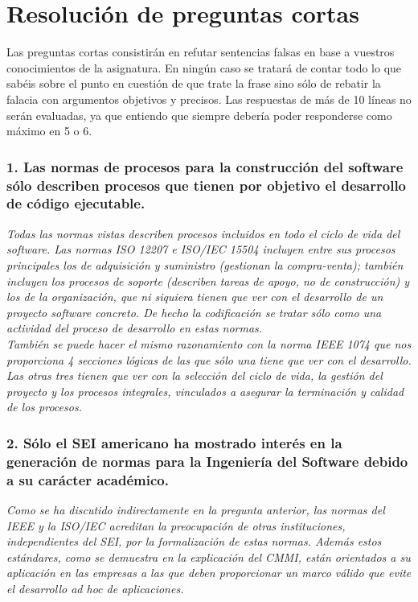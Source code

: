 
\section{Resolución de preguntas cortas}
Las preguntas cortas consistirán en refutar sentencias falsas en base a vuestros conocimientos de la asignatura. En ningún caso se tratará de contar todo lo que sabéis sobre el punto en cuestión de que trate la frase sino sólo de rebatir la falacia con argumentos objetivos y precisos. Las respuestas de más de 10 líneas no serán evaluadas, ya que entiendo que siempre debería poder responderse como máximo en 5 o 6.

\subsubsection*{1. Las normas de procesos para la construcción del software sólo describen procesos que tienen por objetivo el desarrollo de código ejecutable.}
\textit{Todas las normas vistas describen procesos incluidos en todo el ciclo de vida del software. Las normas ISO 12207 e ISO/IEC 15504 incluyen entre sus procesos principales los de adquisición y suministro (gestionan la compra-venta); también incluyen los procesos de soporte (describen tareas de apoyo, no de construcción) y los de la organización, que ni siquiera tienen que ver con el desarrollo de un proyecto software concreto. De hecho la codificación se tratar sólo como una actividad del proceso de desarrollo en estas normas.
\\
También se puede hacer el mismo razonamiento con la norma IEEE 1074 que nos proporciona 4 secciones lógicas de las que sólo una tiene que ver con el desarrollo. Las otras tres tienen que ver con la selección del ciclo de vida, la gestión del proyecto y los procesos integrales, vinculados a asegurar la terminación y calidad de los procesos.}

\subsubsection*{2. Sólo el SEI americano ha mostrado interés en la generación de normas para la Ingeniería del Software debido a su carácter académico.}
\textit{Como se ha discutido indirectamente en la pregunta anterior, las normas del IEEE y la ISO/IEC acreditan la preocupación de otras instituciones, independientes del SEI, por la formalización de estas normas. Además estos estándares, como se demuestra en la explicación del CMMI, están orientados a su aplicación en las empresas a las que deben proporcionar un marco válido que evite el desarrollo ad hoc de aplicaciones.}

